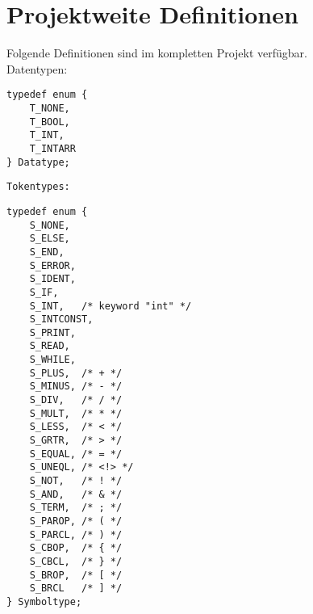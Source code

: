 \chapter{Projektweite Definitionen}
\label{chap:project_defs}

Folgende Definitionen sind im kompletten Projekt verfügbar.\\

Datentypen:
\begin{lstlisting}
typedef enum {
	T_NONE,
	T_BOOL,
	T_INT,
	T_INTARR
} Datatype;
\end{lstlisting}

\texttt{Tokentypes:}
\begin{lstlisting}
typedef enum {
	S_NONE,
	S_ELSE,
	S_END,
	S_ERROR,
	S_IDENT,
	S_IF,
	S_INT,   /* keyword "int" */
	S_INTCONST,
	S_PRINT,
	S_READ,
	S_WHILE,
	S_PLUS,  /* + */
	S_MINUS, /* - */
	S_DIV,	 /* / */
	S_MULT,	 /* * */
	S_LESS,	 /* < */
	S_GRTR,	 /* > */
	S_EQUAL, /* = */
	S_UNEQL, /* <!> */
	S_NOT,	 /* ! */
	S_AND,	 /* & */
	S_TERM,	 /* ; */
	S_PAROP, /* ( */
	S_PARCL, /* ) */
	S_CBOP,	 /* { */
	S_CBCL,	 /* } */
	S_BROP,	 /* [ */
	S_BRCL	 /* ] */
} Symboltype;
\end{lstlisting}